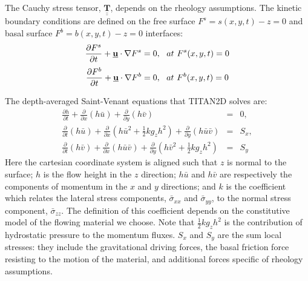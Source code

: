 \documentclass{article}
\def\dt{\partial t}
\begin{document}
The Cauchy stress tensor, $\underline{\underline{{\mathbf{T}}}}$, depends on the rheology assumptions. The kinetic boundary conditions are defined on the free surface $F^s=s(x,y,t)-z=0$ and basal surface $F^b=b(x,y,t)-z=0$ interfaces:
\begin{equation}\label{eq:SurKinBC}
\frac{\partial F^s}{\dt} + \underline{{\textbf u}}\cdot\nabla F^s = 0, \ \ at \ F^s(x,y,t)=0
\end{equation}
\begin{equation}\label{eq:BedKinBC}
\frac{\partial F^b}{\dt} + \underline{{\textbf u}}\cdot\nabla F^b = 0, \ \ at \ F^b(x,y,t)=0
\end{equation}

The depth-averaged Saint-Venant equations that TITAN2D solves are:
\begin{eqnarray}
\label{eq:D_A}
\frac{\partial h}{\partial t} +
\frac{\partial}{\partial x}(h \bar{u}) +
\frac{\partial}{\partial y}(h\bar{v}) &=& 0, \nonumber \\
\frac{\partial}{\partial t} (h\bar{u}) +
\frac{\partial}{\partial x}\left(h\bar{u}^2 + \frac{1}{2}k g_{z}h^2\right) + \frac{\partial}{\partial y}(h\bar{u}\bar{v}) &=& S_{x},\\
\frac{\partial}{\partial t} (h\bar{v}) +
\frac{\partial}{\partial x}(h\bar{u}\bar{v}) +
\frac{\partial}{\partial y}\left(h\bar{v}^2 + \frac{1}{2}k g_{z}h^2\right) &=& S_{y}\nonumber
\end{eqnarray}
Here the cartesian coordinate system is aligned such that $z$ is normal to the surface; $h$ is the flow height in the $z$ direction; $h\bar{u}$ and $h\bar{v}$ are respectively the components of momentum in the $x$ and $y$ directions; and $k$ is the coefficient which relates the lateral stress components, $\bar{\sigma}_{xx}$ and $\bar{\sigma}_{yy}$, to the normal stress component, $\bar{\sigma}_{zz}$. The definition of this coefficient depends on the constitutive model of the flowing material we choose. Note that $\frac{1}{2} k g_z h^2$ is the contribution of hydrostatic pressure to the momentum fluxes. $S_x$ and $S_y$ are the sum local stresses: they include the gravitational driving forces, the basal friction force resisting to the motion of the material, and additional forces specific of rheology assumptions.
\end{document}
